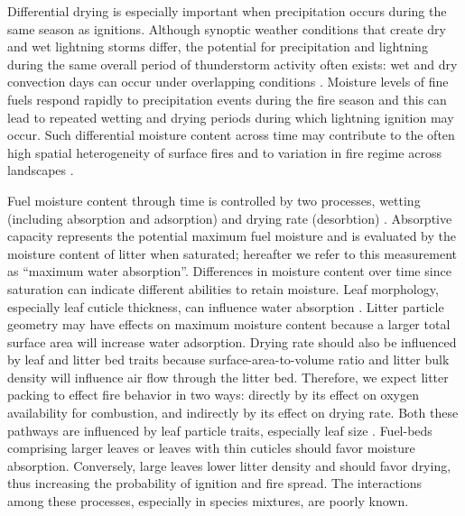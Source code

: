 \documentclass[letterpaper,12pt]{article}
\begin{document}
Differential drying is especially important when precipitation occurs during
the same season as ignitions. Although synoptic weather conditions that create
dry and wet lightning storms differ, the potential for precipitation and
lightning during the same overall period of thunderstorm activity often exists:
wet and dry convection days can occur under overlapping conditions
\citep{Rorig+Ferguson-1999}. Moisture levels of fine fuels respond rapidly to
precipitation events during the fire season \citep{Estes+Knapp+etal-2012} and
this can lead to repeated wetting and drying periods during which lightning
ignition may occur. Such differential moisture content across time may
contribute to the often high spatial heterogeneity of surface fires
\citep{Hille+Stephens-2005, Knapp+Keeley-2006, Kreye_Hiers_etal-2018} and to
variation in fire regime across landscapes \citep{Stephens-2001}.

Fuel moisture content through time is controlled by two processes, wetting
(including absorption and adsorption) and drying rate (desorbtion)
\citep{Anderson-1990, Kreye+Kobziar+etal-2013}. Absorptive capacity represents
the potential maximum fuel moisture and is evaluated by the moisture content of
litter when saturated; hereafter we refer to this measurement as ``maximum
water absorption''. Differences in moisture content over time since saturation
can indicate different abilities to retain moisture. Leaf morphology,
especially leaf cuticle thickness, can influence water absorption
\citep{Van_Wagner-1969}. Litter particle geometry may have effects on maximum
moisture content because a larger total surface area will increase water
adsorption. Drying rate should also be influenced by leaf and litter bed traits
because surface-area-to-volume ratio and litter bulk density will influence air
flow through the litter bed. Therefore, we expect litter packing to effect fire
behavior in two ways: directly by its effect on oxygen availability for
combustion, and indirectly by its effect on drying rate. Both these pathways
are influenced by leaf particle traits, especially leaf size
\citep{Scarff+Westoby-2006}. Fuel-beds comprising larger leaves or leaves with
thin cuticles should favor moisture absorption. Conversely, large leaves lower
litter density and should favor drying, thus increasing the probability of
ignition and fire spread. The interactions among these processes, especially in
species mixtures, are poorly known.
\end{document}
